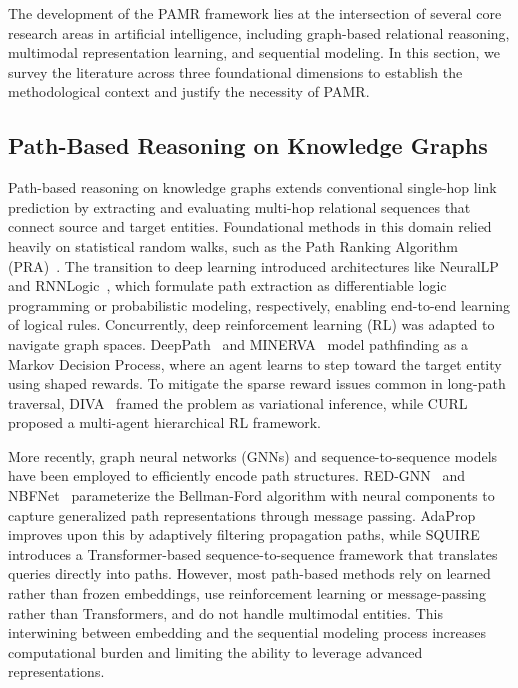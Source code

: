 \documentclass[runningheads]{llncs}
\begin{document}
The development of the PAMR framework lies at the intersection of several core research areas in artificial intelligence, including graph-based relational reasoning, multimodal representation learning, and sequential modeling. In this section, we survey the literature across three foundational dimensions to establish the methodological context and justify the necessity of PAMR.

\subsection{Path-Based Reasoning on Knowledge Graphs}
\label{sec:rw-path-reasoning}

Path-based reasoning on knowledge graphs extends conventional single-hop link prediction by extracting and evaluating multi-hop relational sequences that connect source and target entities. Foundational methods in this domain relied heavily on statistical random walks, such as the Path Ranking Algorithm (PRA)~\cite{lao2011random}. The transition to deep learning introduced architectures like NeuralLP~\cite{yang2017differentiable} and RNNLogic~\cite{qu2021rnnlogic}, which formulate path extraction as differentiable logic programming or probabilistic modeling, respectively, enabling end-to-end learning of logical rules. Concurrently, deep reinforcement learning (RL) was adapted to navigate graph spaces. DeepPath~\cite{xiong2017deeppath} and MINERVA~\cite{das2018go} model pathfinding as a Markov Decision Process, where an agent learns to step toward the target entity using shaped rewards. To mitigate the sparse reward issues common in long-path traversal, DIVA~\cite{chen2018variational} framed the problem as variational inference, while CURL~\cite{zhang2022learning} proposed a multi-agent hierarchical RL framework.

More recently, graph neural networks (GNNs) and sequence-to-sequence models have been employed to efficiently encode path structures. RED-GNN~\cite{zhang2022knowledge} and NBFNet~\cite{zhu2021neural} parameterize the Bellman-Ford algorithm with neural components to capture generalized path representations through message passing. AdaProp~\cite{zhang2023adaprop} improves upon this by adaptively filtering propagation paths, while SQUIRE~\cite{bai2022squire} introduces a Transformer-based sequence-to-sequence framework that translates queries directly into paths. However, most path-based methods rely on learned rather than frozen embeddings, use reinforcement learning or message-passing rather than Transformers, and do not handle multimodal entities. This interwining between embedding and the sequential modeling process increases computational burden and limiting the ability to leverage advanced representations.
\end{document}
